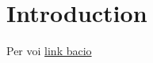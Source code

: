 \chapter{Introduction}\label{chap:introduction}
Per voi
\href{https://external-preview.redd.it/Ti8L_uhkngMW1vahXuL58lYmVFECqovTyUB3FZh0bdc.gif?width=400&format=mp4&s=c7793c22ef61e14cf9f03623ceb9f4792c34f50c}{link bacio}
